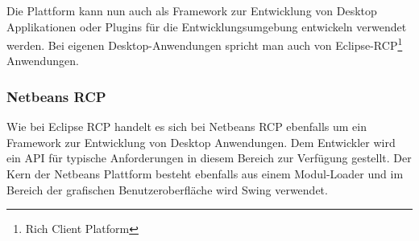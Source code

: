 Die Plattform kann nun auch als Framework zur Entwicklung von Desktop Applikationen oder Plugins für die Entwicklungsumgebung entwickeln verwendet werden. Bei eigenen Desktop-Anwendungen spricht man auch von Eclipse-RCP\footnote{Rich Client Platform} Anwendungen.



\subsubsection{Netbeans RCP}
Wie bei Eclipse RCP handelt es sich bei Netbeans RCP ebenfalls um ein Framework zur Entwicklung von Desktop Anwendungen. Dem Entwickler wird ein API für typische Anforderungen in diesem Bereich zur Verfügung gestellt. Der Kern der Netbeans Plattform besteht ebenfalls aus einem Modul-Loader und im Bereich der grafischen Benutzeroberfläche wird Swing verwendet.

